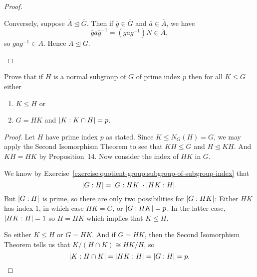 \begin{proof}
\begin{enumerate}
    Conversely, suppose
    $\overline{A}\trianglelefteq\overline{G}$. Then if
    $\bar{g}\in\overline{G}$ and $\bar{a}\in\overline{A}$, we have
    \begin{equation*}
      \bar{g}\bar{a}\bar{g}^{-1}
      = (gag^{-1})N \in \overline{A},
    \end{equation*}
    so $gag^{-1}\in A$. Hence $A\trianglelefteq G$. \qedhere
  \end{enumerate}
\end{proof}

 Prove that if $H$ is a normal subgroup of $G$ of prime
index $p$ then for all $K\leq G$ either
\begin{enumerate}
\item $K\leq H$ or
\item $G = HK$ and $\lvert{K:K\cap H}\rvert = p$.
\end{enumerate}
\begin{proof}
  Let $H$ have prime index $p$ as stated. Since $K\leq N_G(H) = G$, we
  may apply the Second Isomorphism Theorem to see that $KH\leq G$ and
  $H\trianglelefteq KH$. And $KH = HK$ by Proposition~14. Now consider
  the index of $HK$ in $G$.

  We know by
  Exercise~\ref{exercise:quotient-group:subgroup-of-subgroup-index}
  that
  \begin{equation*}
    \lvert{G:H}\rvert = \lvert{G:HK}\rvert\cdot\lvert{HK:H}\rvert.
  \end{equation*}
  But $\lvert{G:H}\rvert$ is prime, so there are only two possibilities for
  $\lvert{G:HK}\rvert$: Either $HK$ has index $1$, in which case $HK = G$, or
  $\lvert{G:HK}\rvert = p$. In the latter case, $\lvert{HK:H}\rvert = 1$ so $H = HK$
  which implies that $K\leq H$.

  So either $K\leq H$ or $G = HK$. And if $G = HK$, then the Second
  Isomorphism Theorem tells us that $K/(H\cap K)\cong HK/H$, so
  \begin{equation*}
    \lvert{K:H\cap K}\rvert = \lvert{HK:H}\rvert = \lvert{G:H}\rvert = p. \qedhere
  \end{equation*}
\end{proof}

